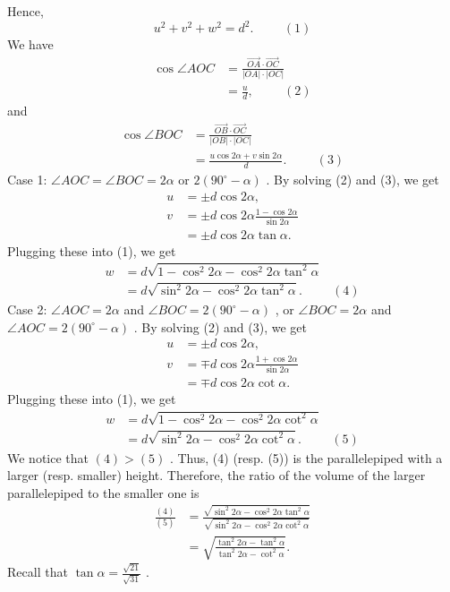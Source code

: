 \documentclass[12pt]{article}
\begin{document}
Hence, \[ u^2 + v^2 + w^2 = d^2 . \hspace{1cm} (1) \] We have \begin{align*} \cos \angle AOC & = \frac{\overrightarrow{OA} \cdot \overrightarrow{OC}}{|OA| \cdot |OC|} \\ & = \frac{u}{d} , \hspace{1cm} (2) \end{align*} and \begin{align*} \cos \angle BOC & = \frac{\overrightarrow{OB} \cdot \overrightarrow{OC}}{|OB| \cdot |OC|} \\ & = \frac{u \cos 2 \alpha + v \sin 2 \alpha}{d} . \hspace{1cm} (3) \end{align*} Case 1: $\angle AOC = \angle BOC = 2 \alpha$ or $2 \left( 90^\circ - \alpha \right)$ . By solving (2) and (3), we get \begin{align*} u & = \pm d \cos 2 \alpha , \\ v & = \pm d \cos 2 \alpha \frac{1 - \cos 2 \alpha}{\sin 2 \alpha} \\ & = \pm d \cos 2 \alpha \tan \alpha . \end{align*} Plugging these into (1), we get \begin{align*} w & = d \sqrt{1 - \cos^2 2 \alpha - \cos^2 2 \alpha \tan^2 \alpha} \\ & = d \sqrt{\sin^2 2 \alpha - \cos^2 2 \alpha \tan^2 \alpha} . \hspace{1cm} (4) \end{align*} Case 2: $\angle AOC = 2 \alpha$ and $\angle BOC = 2 \left( 90^\circ - \alpha \right)$ , or $\angle BOC = 2 \alpha$ and $\angle AOC = 2 \left( 90^\circ - \alpha \right)$ . By solving (2) and (3), we get \begin{align*} u & = \pm d \cos 2 \alpha , \\ v & = \mp d \cos 2 \alpha \frac{1 + \cos 2 \alpha}{\sin 2 \alpha} \\ & = \mp d \cos 2 \alpha \cot \alpha . \end{align*} Plugging these into (1), we get \begin{align*} w & = d \sqrt{1 - \cos^2 2 \alpha - \cos^2 2 \alpha \cot^2 \alpha} \\ & = d \sqrt{\sin^2 2 \alpha - \cos^2 2 \alpha \cot^2 \alpha} . \hspace{1cm} (5) \end{align*} We notice that $(4) > (5)$ . Thus, (4) (resp. (5)) is the parallelepiped with a larger (resp. smaller) height. Therefore, the ratio of the volume of the larger parallelepiped to the smaller one is \begin{align*} \frac{(4)}{(5)} & = \frac{\sqrt{\sin^2 2 \alpha - \cos^2 2 \alpha \tan^2 \alpha}} {\sqrt{\sin^2 2 \alpha - \cos^2 2 \alpha \cot^2 \alpha}} \\ & = \sqrt{\frac{\tan^2 2 \alpha - \tan^2 \alpha}{\tan^2 2 \alpha - \cot^2 \alpha}} . \end{align*} Recall that $\tan \alpha = \frac{\sqrt{21}}{\sqrt{31}}$ .
\end{document}
